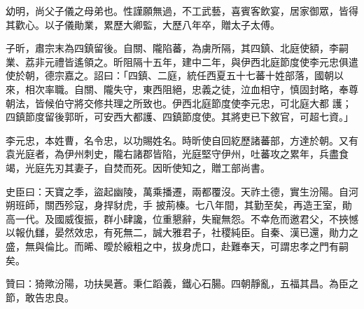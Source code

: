 \begin{pinyinscope}
 幼明，尚父子儀之母弟也。性謹願無過，不工武藝，喜賓客飲宴，居家御眾，皆得
 其歡心。以子儀勛業，累歷大卿監，大歷八年卒，贈太子太傅。



 子昕，肅宗末為四鎮留後。自關、隴陷蕃，為虜所隔，其四鎮、北庭使額，李嗣業、荔非元禮皆遙領之。昕阻隔十五年，建中二年，與伊西北庭節度使李元忠俱遣使於朝，德宗嘉之。詔曰：「四鎮、二庭，統任西夏五十七蕃十姓部落，國朝以來，相次率職。自關、隴失守，東西阻絕，忠義之徒，泣血相守，慎固封略，奉尊朝法，皆候伯守將交修共理之所致也。伊西北庭節度使李元忠，可北庭大都
 護；四鎮節度留後郭昕，可安西大都護、四鎮節度使。其將吏已下敘官，可超七資。」



 李元忠，本姓曹，名令忠，以功賜姓名。時昕使自回紇歷諸蕃部，方達於朝。又有袁光庭者，為伊州刺史，隴右諸郡皆陷，光庭堅守伊州，吐蕃攻之累年，兵盡食竭，光庭先刃其妻子，自焚而死。因昕使知之，贈工部尚書。



 史臣曰：天寶之季，盜起幽陵，萬乘播遷，兩都覆沒。天祚土德，實生汾陽。自河朔班師，關西殄寇，身捍豺虎，手
 披荊榛。七八年間，其勤至矣，再造王室，勛高一代。及國威復振，群小肆讒，位重懇辭，失寵無怨。不幸危而邀君父，不挾憾以報仇讎，晏然效忠，有死無二，誠大雅君子，社稷純臣。自秦、漢已還，勛力之盛，無與倫比。而晞、曖於縗粗之中，拔身虎口，赴難奉天，可謂忠孝之門有嗣矣。



 贊曰：猗歟汾陽，功扶昊蒼。秉仁蹈義，鐵心石腸。四朝靜亂，五福其昌。為臣之節，敢告忠良。



\end{pinyinscope}